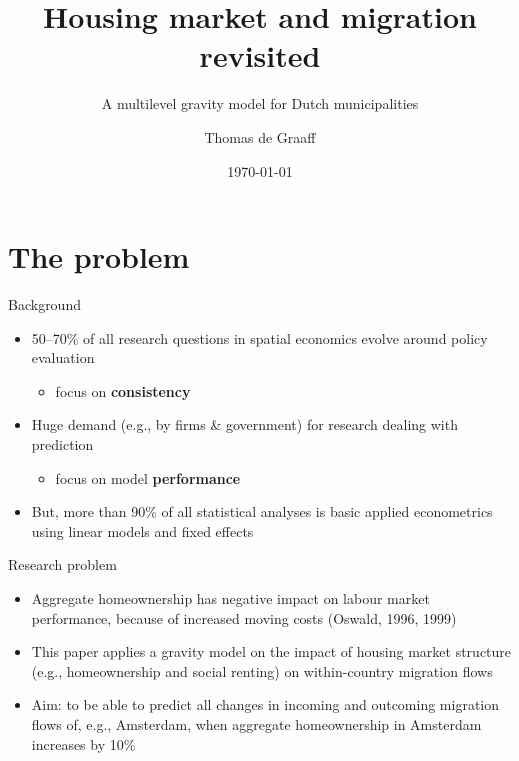 \documentclass{beamer}
\title{Housing market and migration revisited}
\subtitle{A multilevel gravity model for Dutch municipalities}
\date{\today}
\author{Thomas de Graaff}
\institute{Vrije Universiteit Amsterdam\\Department of Spatial Economics}
\begin{document}
\maketitle

\section{The problem}

  \begin{frame}{Background}
    	\begin{itemize}
    		\item 50--70\% of all research questions in spatial economics evolve around policy \alert{evaluation} 
    		\begin{itemize}
    			\item focus on \textbf{consistency}
    		\end{itemize}
    		\item Huge demand (e.g., by firms \& government) for research dealing with \alert{prediction}
    		\begin{itemize}
    			\item focus on model \textbf{performance}
    		\end{itemize}
    		\item But, more than 90\% of all statistical analyses is basic applied econometrics using \alert{linear} models and \alert{fixed} effects
    	\end{itemize}
  \end{frame}

\begin{frame}{Research problem}
	\begin{itemize}
		\item Aggregate homeownership has negative impact on labour market performance, because of increased \alert{moving costs} (Oswald, 1996, 1999)
		\item This paper applies a \alert{gravity model} on the impact of housing market structure (e.g., homeownership and social renting) on within-country migration flows 
		\item Aim: to be able to \alert{predict} all changes in incoming and outcoming migration flows of, e.g., Amsterdam, when aggregate homeownership in Amsterdam increases by 10\%
	\end{itemize}
\end{frame}
\end{document}
